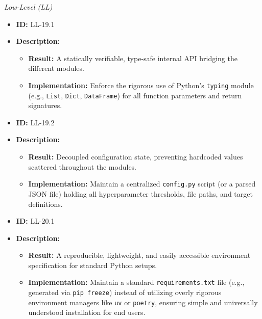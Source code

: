 \documentclass[12pt,a4paper]{article}
\begin{document}
\noindent \textit{Low-Level (LL)}

\begin{itemize}
    \item \textbf{ID:} LL-19.1
    \item \textbf{Description:}
    \begin{itemize}
        \item \textbf{Result:} A statically verifiable, type-safe internal API bridging the different modules.
        \item \textbf{Implementation:} Enforce the rigorous use of Python's \texttt{typing} module (e.g., \texttt{List}, \texttt{Dict}, \texttt{DataFrame}) for all function parameters and return signatures.
    \end{itemize}
\end{itemize}
\vspace{1.5em}

\begin{itemize}
    \item \textbf{ID:} LL-19.2
    \item \textbf{Description:}
    \begin{itemize}
        \item \textbf{Result:} Decoupled configuration state, preventing hardcoded values scattered throughout the modules.
        \item \textbf{Implementation:} Maintain a centralized \texttt{config.py} script (or a parsed JSON file) holding all hyperparameter thresholds, file paths, and target definitions.
    \end{itemize}
\end{itemize}
\vspace{1.5em}

\begin{itemize}
    \item \textbf{ID:} LL-20.1
    \item \textbf{Description:}
    \begin{itemize}
        \item \textbf{Result:} A reproducible, lightweight, and easily accessible environment specification for standard Python setups.
        \item \textbf{Implementation:} Maintain a standard \texttt{requirements.txt} file (e.g., generated via \texttt{pip freeze}) instead of utilizing overly rigorous environment managers like \texttt{uv} or \texttt{poetry}, ensuring simple and universally understood installation for end users.
    \end{itemize}
\end{itemize}
\end{document}
